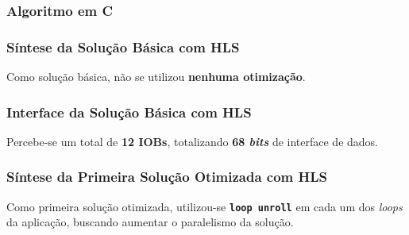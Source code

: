 \documentclass{beamer}
\begin{document}
    \begin{frame}[fragile]
        \frametitle{Algoritmo em C}

    \end{frame}

    \begin{frame}
        \frametitle{Síntese da Solução Básica com HLS}

        \begingroup {}
        Como solução básica,
        não se utilizou \textbf{nenhuma otimização}.
        \endgroup

        \begin{figure}[h] 
            \centering
          \end{figure}
    \end{frame}

    \begin{frame}
        \frametitle{Interface da Solução Básica com HLS}

        \begingroup {}
        Percebe-se um total de \textbf{12 IOBs}, totalizando
        \textbf{68 \textit{bits}} de interface de dados.
        \endgroup

        \begin{figure}[h] 
            \centering
          \end{figure}
    \end{frame}

    \begin{frame}
        \frametitle{Síntese da Primeira Solução Otimizada com HLS}

        \begingroup {}
        Como primeira solução otimizada, utilizou-se \textbf{\texttt{loop unroll}}
        em cada um dos \textit{loops} da aplicação, buscando aumentar o paralelismo
        da solução.
        \endgroup

        \begin{figure}[h] 
            \centering
          \end{figure}
    \end{frame}
\end{document}
